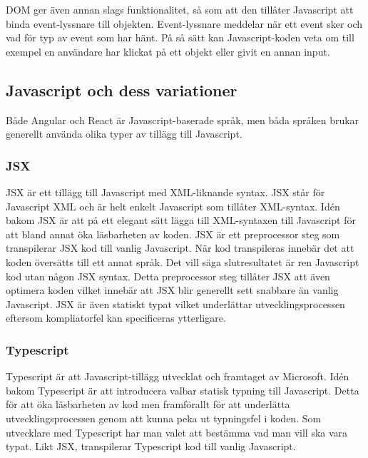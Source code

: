 DOM ger även annan slags funktionalitet, så som att den tillåter Javascript att binda event-lyssnare till objekten.\cite{w3-event} Event-lyssnare meddelar när ett event sker och vad för typ av event som har hänt. På så sätt kan Javascript-koden veta om till exempel en användare har klickat på ett objekt eller givit en annan input.


\subsection{Javascript och dess variationer}
Både Angular och React är Javascript-baserade språk, men båda språken brukar generellt använda olika typer av tillägg till Javascript.

\subsubsection{JSX}
JSX är ett tillägg till Javascript med XML-liknande syntax. JSX står för Javascript XML och är helt enkelt Javascript som tillåter XML-syntax. Idén bakom JSX är att på ett elegant sätt lägga till XML-syntaxen till Javascript för att bland annat öka läsbarheten av koden.\cite{react-jsx} JSX är ett preprocessor steg som transpilerar JSX kod till vanlig Javascript. När kod transpileras innebär det att koden översätts till ett annat språk. Det vill säga slutresultatet är ren Javascript kod utan någon JSX syntax. Detta preprocessor steg tillåter JSX att även optimera koden vilket innebär att JSX blir generellt sett snabbare än vanlig Javascript.\cite{jsx} \cite{facebook-jsx} JSX är även statiskt typat vilket underlättar utvecklingsprocessen eftersom kompliatorfel kan specificeras ytterligare.


\subsubsection{Typescript}
Typescript är att Javascript-tillägg utvecklat och framtaget av Microsoft. Idén bakom Typescript är att introducera valbar statisk typning till Javascript. \cite{typescript} Detta för att öka läsbarheten av kod men framförallt för att underlätta utvecklingsprocessen genom att kunna peka ut typningsfel i koden. Som utvecklare med Typescript har man valet att bestämma vad man vill ska vara typat. Likt JSX, transpilerar Typescript kod till vanlig Javascript. \cite{typescript-book}

